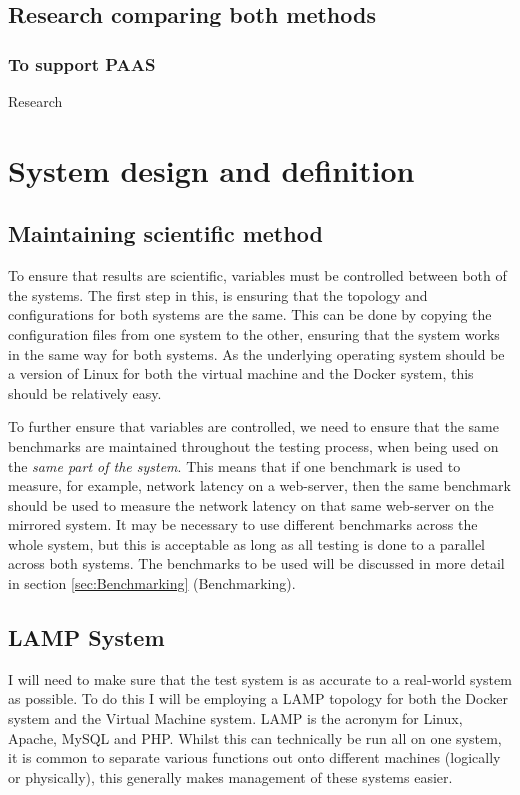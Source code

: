 \section{Research comparing both methods}
\subsection{To support PAAS}
Research %


\chapter{System design and definition}
\label{SystemDesignDefinition}

\section{Maintaining scientific method}
To ensure that results are scientific, variables must be controlled between both of the systems. The first step in this, is ensuring that the topology and configurations for both systems are the same. This can be done by copying the configuration files from one system to the other, ensuring that the system works in the same way for both systems. As the underlying operating system should be a version of Linux for both the virtual machine and the Docker system, this should be relatively easy.

To further ensure that variables are controlled, we need to ensure that the same benchmarks are maintained throughout the testing process, when being used on the \emph{same part of the system}. This means that if one benchmark is used to measure, for example, network latency on a web-server, then the same benchmark should be used to measure the network latency on that same web-server on the mirrored system. It may be necessary to use different benchmarks across the whole system, but this is acceptable as long as all testing is done to a parallel across both systems. The benchmarks to be used will be discussed in more detail in section \ref{sec:Benchmarking} (Benchmarking).


\section{LAMP System}
\label{sec:LAMPsystem}
I will need to make sure that the test system is as accurate to a real-world system as possible. To do this I will be employing a LAMP topology for both the Docker system and the Virtual Machine system. LAMP is the acronym for Linux, Apache, MySQL and PHP. Whilst this can technically be run all on one system, it is common to separate various functions out onto different machines (logically or physically), this generally makes management of these systems easier.

